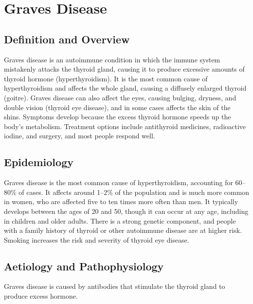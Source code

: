 \chapter{Graves Disease}

\section*{Definition and Overview}
Graves disease is an autoimmune condition in which the immune system mistakenly attacks the thyroid gland, causing it to produce excessive amounts of thyroid hormone (hyperthyroidism). It is the most common cause of hyperthyroidism and affects the whole gland, causing a diffusely enlarged thyroid (goitre). Graves disease can also affect the eyes, causing bulging, dryness, and double vision (thyroid eye disease), and in some cases affects the skin of the shins. Symptoms develop because the excess thyroid hormone speeds up the body's metabolism. Treatment options include antithyroid medicines, radioactive iodine, and surgery, and most people respond well.

\section*{Epidemiology}
Graves disease is the most common cause of hyperthyroidism, accounting for 60--80\% of cases. It affects around 1--2\% of the population and is much more common in women, who are affected five to ten times more often than men. It typically develops between the ages of 20 and 50, though it can occur at any age, including in children and older adults. There is a strong genetic component, and people with a family history of thyroid or other autoimmune disease are at higher risk. Smoking increases the risk and severity of thyroid eye disease.

\section*{Aetiology and Pathophysiology}
Graves disease is caused by antibodies that stimulate the thyroid gland to produce excess hormone.

